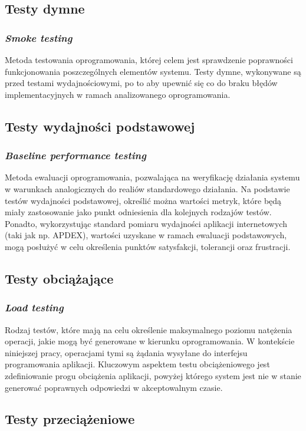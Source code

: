 \subsection*{Testy dymne}
\subsubsection{\textit{Smoke testing}}
Metoda testowania oprogramowania, której celem jest sprawdzenie poprawności funkcjonowania poszczególnych elementów systemu. Testy dymne, wykonywane są przed testami wydajnościowymi, po to aby upewnić się co do braku błędów implementacyjnych w ramach analizowanego oprogramowania.

\subsection*{Testy wydajności podstawowej}
\subsubsection{\textit{Baseline performance testing}}
Metoda ewaluacji oprogramowania, pozwalająca na weryfikację działania systemu w warunkach analogicznych do realiów standardowego działania. Na podstawie testów wydajności podstawowej, określić można wartości metryk, które będą miały zastosowanie jako punkt odniesienia dla kolejnych rodzajów testów. Ponadto, wykorzystując standard pomiaru wydajności aplikacji internetowych (taki jak np. APDEX), wartości uzyskane w ramach ewaluacji podstawowych, mogą posłużyć w celu określenia punktów satysfakcji, tolerancji oraz frustracji.

\subsection*{Testy obciążające}
\subsubsection{\textit{Load testing}}
Rodzaj testów, które mają na celu określenie maksymalnego poziomu natężenia operacji, jakie mogą być generowane w kierunku oprogramowania. W kontekście niniejszej pracy, operacjami tymi są żądania wysyłane do interfejsu programowania aplikacji. Kluczowym aspektem testu obciążeniowego jest zdefiniowanie progu obciążenia aplikacji, powyżej którego system jest nie w stanie generować poprawnych odpowiedzi w akceptowalnym czasie.

\subsection*{Testy przeciążeniowe}
